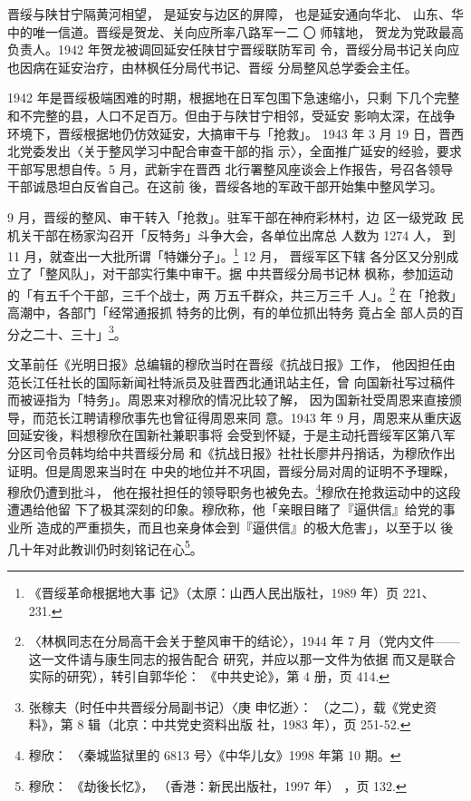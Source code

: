 晋绥与陕甘宁隔黄河相望，
是延安与边区的屏障，
也是延安通向华北、
山东、华中的唯一信道。晋绥是贺龙、关向应所率八路军一二 〇 师辖地，
贺龙为党政最高负责人。1942 年贺龙被调回延安任陕甘宁晋绥联防军司
令，晋绥分局书记关向应也因病在延安治疗，由林枫任分局代书记、晋绥
分局整风总学委会主任。

1942 年是晋绥极端困难的时期，根据地在日军包围下急速缩小，只剩
下几个完整和不完整的县，人口不足百万。但由于与陕甘宁相邻，受延安
影响太深，在战争环境下，晋绥根据地仍仿效延安，大搞审干与「抢救」。
1943 年 3 月 19 日，晋西北党委发出〈关于整风学习中配合审查干部的指
示〉，全面推广延安的经验，要求干部写思想自传。5 月，武新宇在晋西
北行署整风座谈会上作报告，号召各领导干部诚恳坦白反省自己。在这前
後，晋绥各地的军政干部开始集中整风学习。

9 月，晋绥的整风、审干转入「抢救」。驻军干部在神府彩林村，边 区一级党政
民机关干部在杨家沟召开「反特务」斗争大会，各单位出席总 人数为 1274 人，
到 11 月，就查出一大批所谓「特嫌分子」。\footnote{《晋绥革命根据地大事
记》（太原：山西人民出版社，1989 年）页 221、231.} 12 月， 晋绥军区下辖
各分区又分别成立了「整风队」，对干部实行集中审干。据 中共晋绥分局书记林
枫称，参加运动的「有五千个干部，三千个战士，两 万五千群众，共三万三千
人」。\footnote{〈林枫同志在分局高干会关于整风审干的结论〉，1944 年 7
月（党内文件——这一文件请与康生同志的报告配合 研究，并应以那一文件为依据
而又是联合实际的研究），转引自郭华伦： 《中共史论》，第 4 册，页 414.}
在「抢救」高潮中，各部门「经常通报抓 特务的比例，有的单位抓出特务 竟占全
部人员的百分之二十、三十」\footnote{张稼夫（时任中共晋绥分局副书记）〈庚
申忆逝〉： （之二），载《党史资料》，第 8 辑（北京：中共党史资料出版
社，1983 年），页 251-52.  }。

文革前任《光明日报》总编辑的穆欣当时在晋绥《抗战日报》工作，
他因担任由范长江任社长的国际新闻社特派员及驻晋西北通讯站主任，曾
向国新社写过稿件而被诬指为「特务」。周恩来对穆欣的情况比较了解，
因为国新社受周恩来直接颁导，而范长江聘请穆欣事先也曾征得周恩来同
意。1943 年 9 月，周恩来从重庆返回延安後，料想穆欣在国新社兼职事将
会受到怀疑，于是主动托晋绥军区第八军分区司令员韩均给中共晋绥分局
和《抗战日报》社社长廖井丹捎话，为穆欣作出证明。但是周恩来当时在
中央的地位并不巩固，晋绥分局对周的证明不予理睬，穆欣仍遭到批斗，
他在报社担任的领导职务也被免去。\footnote{穆欣：
〈秦城监狱里的 6813 号〉《中华儿女》1998 年第 10 期。}穆欣在抢救运动中的这段遭遇给他留
下了极其深刻的印象。穆欣称，他「亲眼目睹了『逼供信』给党的事业所
造成的严重损失，而且也亲身体会到『逼供信』的极大危害」，以至于以
後几十年对此教训仍时刻铭记在心\footnote{穆欣：
《劫後长忆》，
（香港：新民出版社，1997 年）
，页 132.}。

